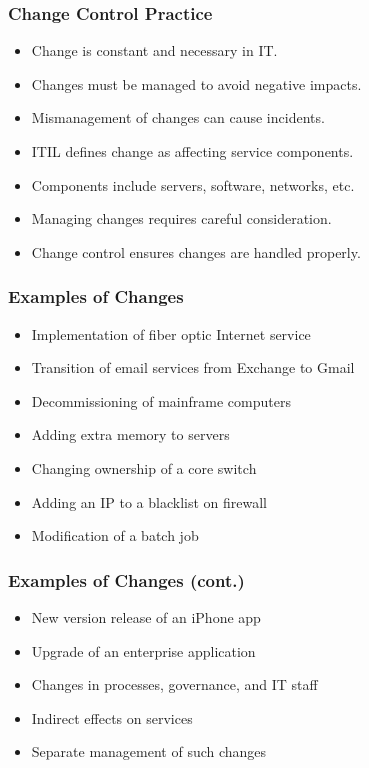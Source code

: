 \documentclass[aspectratio=169, table]{beamer}
\begin{document}
\begin{frame}
	\frametitle{Change Control Practice}
	\begin{itemize}
		\item Change is constant and necessary in IT.
		\item Changes must be managed to avoid negative impacts.
		\item Mismanagement of changes can cause incidents.
		\item ITIL defines change as affecting service components.
		\item Components include servers, software, networks, etc.
		\item Managing changes requires careful consideration.
		\item Change control ensures changes are handled properly.
	\end{itemize}
\end{frame}

\begin{frame}
	\frametitle{Examples of Changes}
	\begin{itemize}
		\item Implementation of fiber optic Internet service
		\item Transition of email services from Exchange to Gmail
		\item Decommissioning of mainframe computers
		\item Adding extra memory to servers
		\item Changing ownership of a core switch
		\item Adding an IP to a blacklist on firewall
		\item Modification of a batch job
	\end{itemize}
\end{frame}

\begin{frame}
	\frametitle{Examples of Changes (cont.)}
	\begin{itemize}
		\item New version release of an iPhone app
		\item Upgrade of an enterprise application
		\item Changes in processes, governance, and IT staff
		\item Indirect effects on services
		\item Separate management of such changes
	\end{itemize}
\end{frame}
\end{document}
